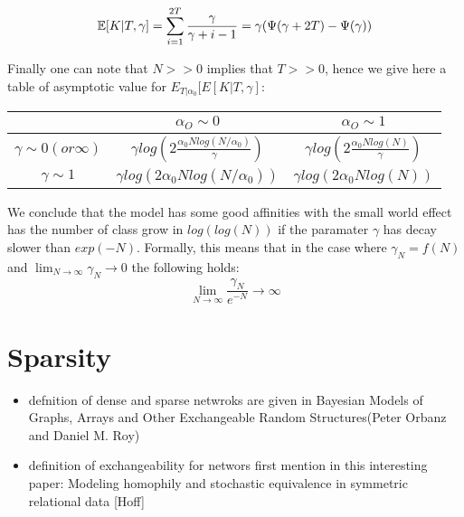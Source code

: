 \documentclass[a4paper, 12pt]{article}
\begin{document}
\begin{equation}
\mathbb{E}[K|T, \gamma] = \sum_{i=1}^{2T} \frac{\gamma}{\gamma +i-1} = \gamma (\Psi(\gamma+2T) - \Psi(\gamma))
\end{equation}

Finally one can note that $N >> 0$ implies that $T>>0$, hence we give here a table of asymptotic value for $E_{T|\alpha_0}[E[K|T, \gamma]$:

	\begin{tabular}{c|cc}
		 & $\alpha_O \sim 0$&$\alpha_O \sim 1$ \\
		\hline
		$\gamma \sim 0 (or \infty)$ & $\gamma log(2\frac{\alpha_0Nlog(N/\alpha_0)}{\gamma})$ & $\gamma log(2\frac{\alpha_0Nlog(N)}{\gamma})$ \\
		$\gamma \sim 1$ & $\gamma log(2\alpha_0Nlog(N/\alpha_0))$ &  $\gamma log(2\alpha_0Nlog(N))$
	\end{tabular}

We conclude that the model has some good affinities with the small world effect has the number of class grow in $log(log(N))$ if the paramater $\gamma$ has decay slower than $exp(-N)$. Formally, this means that in the case where  $\gamma_N = f(N)$ and $\lim_{N\to\infty}\gamma_N \to 0$ the following holds:
$$\lim_{N\to\infty} \frac{\gamma_N}{e^{-N}} \to \infty$$


\section{Sparsity}

\begin{itemize}
\item defnition of dense and sparse netwroks are given in Bayesian Models of Graphs, Arrays and Other Exchangeable Random Structures(Peter Orbanz and Daniel M. Roy) \\

\item definition of exchangeability for networs first mention in this interesting paper: Modeling homophily and stochastic equivalence in symmetric relational data [Hoff]
\end{itemize}
\end{document}
